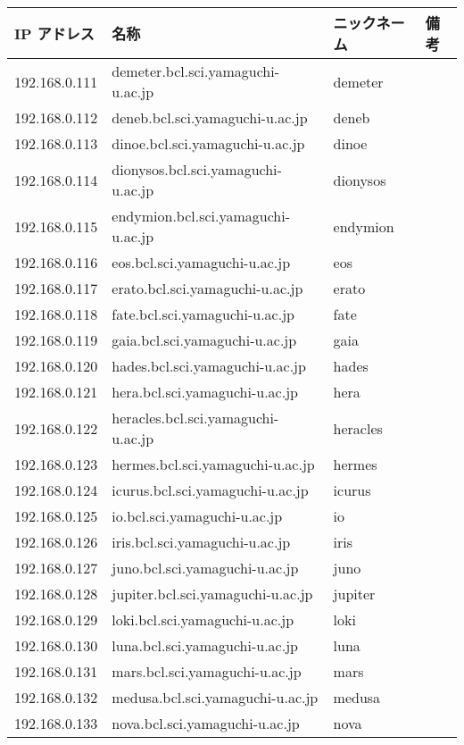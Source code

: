 \documentclass{jarticle}
\begin{document}
{\small
\begin{table}[tbp]
\centering
\begin{tabular}[t]{llll}\hline
IP アドレス &	名称 &					ニックネーム &	備考 \\ \hline
192.168.0.111 &	demeter.bcl.sci.yamaguchi-u.ac.jp &	demeter & \\
192.168.0.112 &	deneb.bcl.sci.yamaguchi-u.ac.jp &	deneb & \\
192.168.0.113 &	dinoe.bcl.sci.yamaguchi-u.ac.jp &	dinoe & \\
192.168.0.114 &	dionysos.bcl.sci.yamaguchi-u.ac.jp &	dionysos & \\
192.168.0.115 &	endymion.bcl.sci.yamaguchi-u.ac.jp &	endymion & \\
192.168.0.116 &	eos.bcl.sci.yamaguchi-u.ac.jp &		eos & \\
192.168.0.117 &	erato.bcl.sci.yamaguchi-u.ac.jp &	erato & \\
192.168.0.118 &	fate.bcl.sci.yamaguchi-u.ac.jp &	fate & \\
192.168.0.119 &	gaia.bcl.sci.yamaguchi-u.ac.jp &	gaia & \\
192.168.0.120 &	hades.bcl.sci.yamaguchi-u.ac.jp &	hades & \\
192.168.0.121 &	hera.bcl.sci.yamaguchi-u.ac.jp &	hera & \\
192.168.0.122 &	heracles.bcl.sci.yamaguchi-u.ac.jp &	heracles & \\
192.168.0.123 &	hermes.bcl.sci.yamaguchi-u.ac.jp &	hermes & \\
192.168.0.124 &	icurus.bcl.sci.yamaguchi-u.ac.jp &	icurus & \\
192.168.0.125 &	io.bcl.sci.yamaguchi-u.ac.jp &		io & \\
192.168.0.126 &	iris.bcl.sci.yamaguchi-u.ac.jp &	iris & \\
192.168.0.127 &	juno.bcl.sci.yamaguchi-u.ac.jp &	juno & \\
192.168.0.128 &	jupiter.bcl.sci.yamaguchi-u.ac.jp &	jupiter & \\
192.168.0.129 &	loki.bcl.sci.yamaguchi-u.ac.jp &	loki & \\
192.168.0.130 &	luna.bcl.sci.yamaguchi-u.ac.jp &	luna & \\
192.168.0.131 &	mars.bcl.sci.yamaguchi-u.ac.jp &	mars & \\
192.168.0.132 &	medusa.bcl.sci.yamaguchi-u.ac.jp &	medusa & \\
192.168.0.133 &	nova.bcl.sci.yamaguchi-u.ac.jp &	nova & \\

\end{tabular}
\end{table}}
\end{document}
